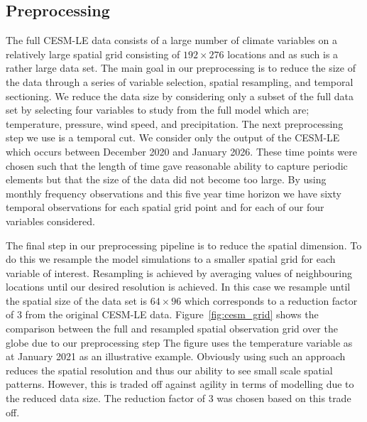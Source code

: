  \subsection{Preprocessing \label{sec:preprocessing}}
 The full CESM-LE data consists of a large number of climate variables on a relatively large spatial grid consisting of $192 \times 276$ locations and as such is a rather large data set. 
 The main goal in our preprocessing is to reduce the size of the data through a series of variable selection, spatial resampling, and temporal sectioning.
 We reduce the data size by considering only a subset of the full data set by selecting four variables to study from the full model which are; temperature, pressure, wind speed, and precipitation. 
 The next preprocessing step we use is a temporal cut.
 We consider only the output of the CESM-LE which occurs between December 2020 and January 2026. 
 These time points were chosen such that the length of time gave reasonable ability to capture periodic elements but that the size of the data did not become too large.
 By using monthly frequency observations and this five year time horizon we have sixty temporal observations for each spatial grid point and for each of our four variables considered. 
 
 The final step in our preprocessing pipeline is to reduce the spatial dimension.
 To do this we resample the model simulations to a smaller spatial grid for each variable of interest.
 Resampling is achieved by averaging values of neighbouring locations until our desired resolution is achieved.
 In this case we resample until the spatial size of the data set is $64 \times 96$ which corresponds to a reduction factor of $3$ from the original CESM-LE data.
 Figure~\ref{fig:cesm_grid} shows the comparison between the full and resampled spatial observation grid over the globe due to our preprocessing step
 The figure uses the temperature variable as at January 2021 as an illustrative example. 
 Obviously using such an approach reduces the spatial resolution and thus our ability to see small scale spatial patterns.
 However, this is traded off against agility in terms of modelling due to the reduced data size.
 The reduction factor of $3$ was chosen based on this trade off.
 
